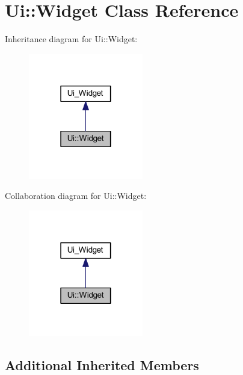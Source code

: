 \hypertarget{class_ui_1_1_widget}{}\section{Ui\+:\+:Widget Class Reference}
\label{class_ui_1_1_widget}


Inheritance diagram for Ui\+:\+:Widget\+:\nopagebreak
\begin{figure}[H]
\begin{center}
\leavevmode
\includegraphics[width=142pt]{class_ui_1_1_widget__inherit__graph}
\end{center}
\end{figure}


Collaboration diagram for Ui\+:\+:Widget\+:\nopagebreak
\begin{figure}[H]
\begin{center}
\leavevmode
\includegraphics[width=142pt]{class_ui_1_1_widget__coll__graph}
\end{center}
\end{figure}
\subsection*{Additional Inherited Members}
